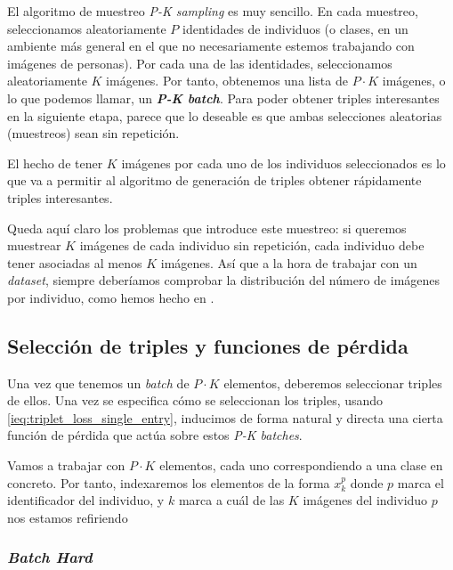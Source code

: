 El algoritmo de muestreo \textit{P-K sampling} es muy sencillo. En cada muestreo, seleccionamos aleatoriamente $P$ identidades de individuos (o clases, en un ambiente más general en el que no necesariamente estemos trabajando con imágenes de personas). Por cada una de las identidades, seleccionamos aleatoriamente $K$ imágenes. Por tanto, obtenemos una lista de $P \cdot K$ imágenes, o lo que podemos llamar, un \textbf{\textit{P-K batch}}. Para poder obtener triples interesantes en la siguiente etapa, parece que lo deseable es que ambas selecciones aleatorias (muestreos) sean sin repetición.

El hecho de tener $K$ imágenes por cada uno de los individuos seleccionados es lo que va a permitir al algoritmo de generación de triples obtener rápidamente triples interesantes.

Queda aquí claro los problemas que introduce este muestreo: si queremos muestrear $K$ imágenes de cada individuo sin repetición, cada individuo debe tener asociadas al menos $K$ imágenes. Así que a la hora de trabajar con un \textit{dataset}, siempre deberíamos comprobar la distribución del número de imágenes por individuo, como hemos hecho en .

\subsection{Selección de triples y funciones de pérdida} \label{isubs:seleccion_de_triples}

Una vez que tenemos un \textit{batch} de $P \cdot K$ elementos, deberemos seleccionar triples de ellos. Una vez se especifica cómo se seleccionan los triples, usando \eqref{ieq:triplet_loss_single_entry}, inducimos de forma natural y directa una cierta función de pérdida que actúa sobre estos \textit{P-K batches}.

\begin{observacion}

    Vamos a trabajar con $P \cdot K$ elementos, cada uno correspondiendo a una clase en concreto. Por tanto, indexaremos los elementos de la forma $x_k^p$ donde $p$ marca el identificador del individuo, y $k$ marca a cuál de las $K$ imágenes del individuo $p$ nos estamos refiriendo

\end{observacion}

\subsubsection{\textit{Batch Hard}} \label{isubsubs:batch_hard}

